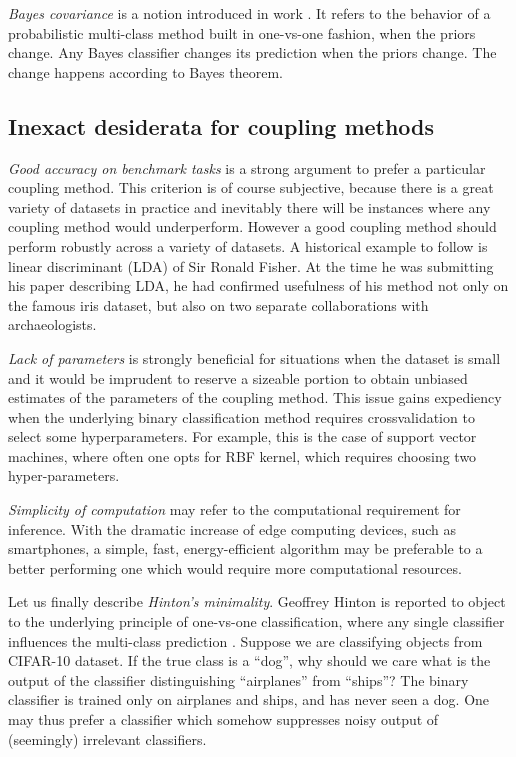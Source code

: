\documentclass[twoside,11pt]{article}
\begin{document}
\emph{Bayes covariance} is a notion introduced in work \cite{BarredaSuch}. It refers to the behavior of a probabilistic multi-class method built in one-vs-one fashion, when the priors change. Any Bayes classifier changes its prediction when the priors change. The change happens according to Bayes theorem.


\subsection{Inexact desiderata for coupling methods}

\emph{Good accuracy on benchmark tasks} is  a strong argument to prefer a particular coupling method. This criterion is of course subjective, because there is a great variety of datasets in practice and inevitably there will be instances where any coupling method would underperform. However a good coupling method should perform robustly across a variety of datasets. A historical  example to follow is linear discriminant (LDA) of  Sir Ronald Fisher. At the time he was submitting his paper describing LDA, he had confirmed usefulness of his method not only on the famous iris dataset, but also on two separate collaborations with archaeologists. 

\emph{Lack of parameters} is strongly beneficial for situations when the dataset is small and it would be imprudent to reserve a sizeable portion to obtain unbiased estimates of the parameters of the coupling method. This issue gains expediency when the underlying binary classification method requires crossvalidation to select some hyperparameters. For example, this is the case of support vector machines, where often one opts for RBF kernel, which requires choosing two hyper-parameters. 

\emph{Simplicity of computation}  may refer to the computational requirement for inference. With the dramatic increase of edge computing devices, such as smartphones, a simple, fast, energy-efficient algorithm may be preferable to a better performing one which would require more computational resources. 

Let us finally describe \emph{Hinton's minimality}. Geoffrey Hinton is reported to object to the underlying principle of one-vs-one classification, where any single classifier influences the multi-class prediction \cite[p.~467]{hastie1998classification}. Suppose we are classifying objects from CIFAR-10 dataset.  If the true class is  a ``dog'', why should we care what is the output of the classifier distinguishing ``airplanes'' from ``ships''? The binary classifier is trained only on airplanes and ships, and has never seen a dog. One may thus prefer a classifier which somehow suppresses noisy output of (seemingly) irrelevant classifiers.
\end{document}
